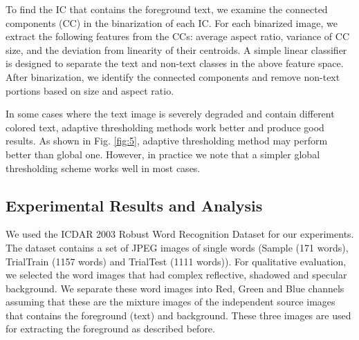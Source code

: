 










To find the IC that contains the foreground text, we examine the connected components (CC) in the 
binarization of each IC. For each binarized image, we extract the following features from the CCs: 
average aspect ratio, variance of  CC size, and the deviation from linearity of their centroids.
A simple linear classifier is designed to separate the text and non-text classes in the above feature space.
After binarization, we identify the
connected components and remove non-text portions based on size and aspect ratio.

In some cases where the text image is severely degraded and contain different colored text,
adaptive thresholding methods work better and produce good results. As shown in Fig. \ref{fig:5}, adaptive thresholding
method may perform better than global one. However, in practice we note that a simpler global thresholding
scheme works well in most cases.

\subsection{Experimental Results and Analysis}

We used the ICDAR 2003 Robust Word Recognition Dataset \cite{A15} for our experiments.
The dataset contains a set of JPEG images of single words (Sample (171 words), 
TrialTrain (1157 words) and TrialTest (1111 words)). For qualitative evaluation,
we selected the word images that had complex reflective, shadowed and specular background.  
We separate these word images into Red, Green and Blue channels
assuming that these are the mixture images of the independent source images
that contains the foreground (text) and background. These three images are used
for extracting the foreground as described before.

